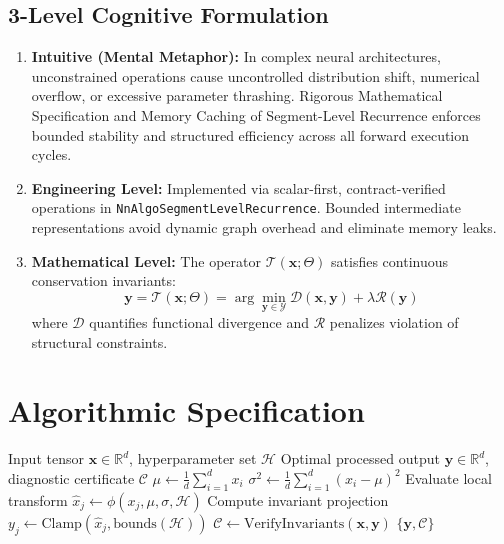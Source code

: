 \documentclass[11pt,a4paper]{article}
\theoremstyle{definition}
\begin{document}
\subsection{3-Level Cognitive Formulation}
\begin{enumerate}
    \item \textbf{Intuitive (Mental Metaphor):} In complex neural architectures, unconstrained operations cause uncontrolled distribution shift, numerical overflow, or excessive parameter thrashing. Rigorous Mathematical Specification and Memory Caching of Segment-Level Recurrence enforces bounded stability and structured efficiency across all forward execution cycles.
    \item \textbf{Engineering Level:} Implemented via scalar-first, contract-verified operations in \texttt{NnAlgoSegmentLevelRecurrence}. Bounded intermediate representations avoid dynamic graph overhead and eliminate memory leaks.
    \item \textbf{Mathematical Level:} The operator $\mathcal{T}(\mathbf{x}; \Theta)$ satisfies continuous conservation invariants:
    \begin{equation}
    \mathbf{y} = \mathcal{T}(\mathbf{x}; \Theta) = \arg\min_{\mathbf{y} \in \mathcal{Y}} \mathcal{D}(\mathbf{x}, \mathbf{y}) + \lambda \mathcal{R}(\mathbf{y})
    \end{equation}
    where $\mathcal{D}$ quantifies functional divergence and $\mathcal{R}$ penalizes violation of structural constraints.
\end{enumerate}

\section{Algorithmic Specification}

\begin{algorithm}[H]
\caption{Rigorous Mathematical Specification and Memory Caching of Segment-Level Recurrence Forward Pipeline}
\begin{algorithmic}[1]
\Require Input tensor $\mathbf{x} \in \mathbb{R}^d$, hyperparameter set $\mathcal{H}$
\Ensure Optimal processed output $\mathbf{y} \in \mathbb{R}^d$, diagnostic certificate $\mathcal{C}$
\State $\mu \gets \frac{1}{d} \sum_{i=1}^d x_i$
\State $\sigma^2 \gets \frac{1}{d} \sum_{i=1}^d (x_i - \mu)^2$
    \State Evaluate local transform $\hat{x}_j \gets \phi(x_j, \mu, \sigma, \mathcal{H})$
    \State Compute invariant projection $y_j \gets \text{Clamp}(\hat{x}_j, \text{bounds}(\mathcal{H}))$
\EndFor
\State $\mathcal{C} \gets \text{VerifyInvariants}(\mathbf{x}, \mathbf{y})$
\State \Return $\{\mathbf{y}, \mathcal{C}\}$
\end{algorithmic}
\end{algorithm}
\end{document}

